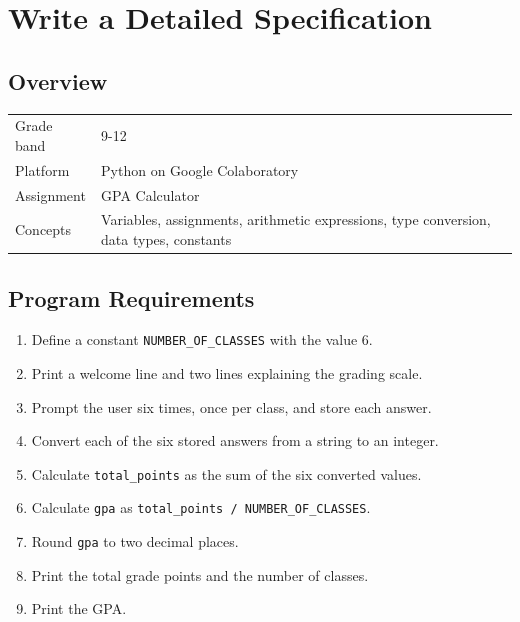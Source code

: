 \documentclass[11pt]{article}
\begin{document}
\section{Write a Detailed Specification}
\label{sec:org87e54b1}

\subsection{Overview}
\label{sec:orgc9cc402}

\begin{center}
\begin{tabular}{ll}
Grade band & 9-12\\
Platform & Python on Google Colaboratory\\
Assignment & GPA Calculator\\
Concepts & Variables, assignments, arithmetic expressions, type conversion, data types, constants\\
\end{tabular}
\end{center}
\subsection{Program Requirements}
\label{sec:org47b491e}

\begin{enumerate}
\item Define a constant \texttt{NUMBER\_OF\_CLASSES} with the value 6.\\
\item Print a welcome line and two lines explaining the grading scale.\\
\item Prompt the user six times, once per class, and store each answer.\\
\item Convert each of the six stored answers from a string to an integer.\\
\item Calculate \texttt{total\_points} as the sum of the six converted values.\\
\item Calculate \texttt{gpa} as \texttt{total\_points / NUMBER\_OF\_CLASSES}.\\
\item Round \texttt{gpa} to two decimal places.\\
\item Print the total grade points and the number of classes.\\
\item Print the GPA.\\
\end{enumerate}
\end{document}
